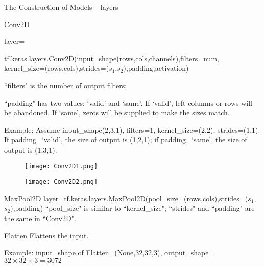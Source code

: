 \documentclass{beamer}
\begin{document}
\begin{frame}{The Construction of Models -- layers}
\begin{block}{Conv2D}
{\color{blue} \small{layer=

tf.keras.layers.Conv2D(input\_shape(rows,cols,channels),filters=num,
kernel\_size=(rows,cols),strides=($s_1$,$s_2$),padding,activation)}}

``filters" is the number of output filters;

``padding" has two values: `valid' and `same'. If `valid', left columns or rows will be abandoned. If `same', zeros will be supplied to make the sizes match.
\end{block}

\begin{flushleft}
  Example: Assume input\_shape(2,3,1), filters=1, kernel\_size=(2,2), strides=(1,1). If padding=`valid', the size of output is (1,2,1); if padding=`same', the size of output is (1,3,1).
\end{flushleft}
\begin{figure}
\centering
\begin{minipage}[t]{0.25\linewidth}
\centering
\texttt{[image: Conv2D1.png]}
\end{minipage}
\begin{minipage}[t]{0.25\linewidth}
\centering
\texttt{[image: Conv2D2.png]}
\end{minipage}
\end{figure}

\end{frame}

\begin{frame}
\begin{block}{MaxPool2D}
{\color{blue} \small{layer=tf.keras.layers.MaxPool2D(pool\_size=(rows,cols),strides=($s_1$,$s_2$),padding)}}
``pool\_size" is similar to ``kernel\_size";
``strides" and ``padding" are the same in ``Conv2D".
\end{block}

\begin{block}{Flatten}
Flattens the input.
\end{block}
\begin{flushleft}
Example: input\_shape of Flatten=(None,32,32,3), output\_shape=$32\times 32\times 3=3072$
\end{flushleft}
\end{frame}
\end{document}
